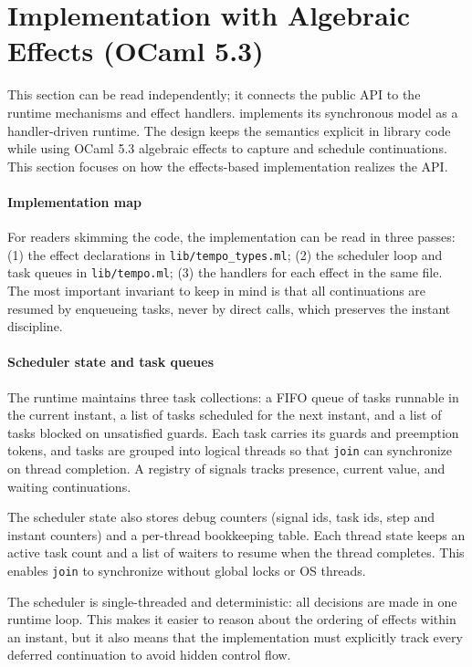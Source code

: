 \section{Implementation with Algebraic Effects (OCaml 5.3)}
This section can be read independently; it connects the public API to the
runtime mechanisms and effect handlers.
\tempo{} implements its synchronous model as a handler-driven runtime. The design
keeps the semantics explicit in library code while using OCaml 5.3 algebraic
effects to capture and schedule continuations. This section focuses on how the
effects-based implementation realizes the \tempo{} API.

\paragraph{Implementation map}
For readers skimming the code, the implementation can be read in three passes:
(1) the effect declarations in \texttt{lib/tempo\_types.ml}; (2) the scheduler
loop and task queues in \texttt{lib/tempo.ml}; (3) the handlers for each effect
in the same file. The most important invariant to keep in mind is that all
continuations are resumed by enqueueing tasks, never by direct calls, which
preserves the instant discipline.

\paragraph{Scheduler state and task queues}
The runtime maintains three task collections: a FIFO queue of tasks runnable
in the current instant, a list of tasks scheduled for the next instant, and a
list of tasks blocked on unsatisfied guards. Each task carries its guards and
preemption tokens, and tasks are grouped into logical threads so that
\texttt{join} can synchronize on thread completion. A registry of signals
tracks presence, current value, and waiting continuations.

The scheduler state also stores debug counters (signal ids, task ids, step and
instant counters) and a per-thread bookkeeping table. Each thread state keeps
an active task count and a list of waiters to resume when the thread completes.
This enables \texttt{join} to synchronize without global locks or OS threads.

The scheduler is single-threaded and deterministic: all decisions are made in
one runtime loop. This makes it easier to reason about the ordering of effects
within an instant, but it also means that the implementation must explicitly
track every deferred continuation to avoid hidden control flow.

